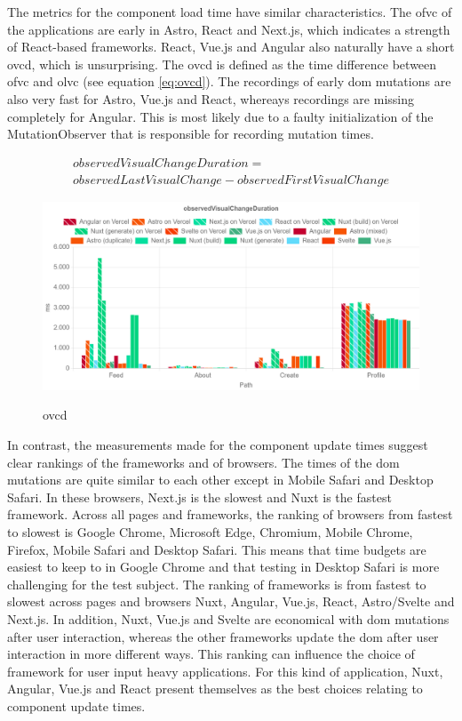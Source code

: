 \documentclass[a4paper, 12pt]{article}
\begin{document}
The metrics for the component load time have similar characteristics.
The \acrshort{ofvc} of the applications are early in Astro, React and Next.js, which indicates a strength of React-based frameworks.
React, Vue.js and Angular also naturally have a short \acrfull{ovcd}, which is unsurprising.
The \acrshort{ovcd} is defined as the time difference between \acrshort{ofvc} and \acrshort{olvc} (see equation \ref{eq:ovcd}).
The recordings of early \acrshort{dom} mutations are also very fast for Astro, Vue.js and React, whereays recordings are missing completely for Angular.
This is most likely due to a faulty initialization of the MutationObserver that is responsible for recording mutation times.

\begin{multline}\label{eq:ovcd}
  \mathit{observedVisualChangeDuration} =\\ \mathit{observedLastVisualChange} - \mathit{observedFirstVisualChange}
\end{multline}

\begin{figure}[h]
  \centering
  \includegraphics[width=0.8\linewidth, keepaspectratio]{img/lighthouse-results/olvc-ofvc.png}
  \label{fig:LH:OVCD}
  \caption{\acrfull{ovcd}}
\end{figure}

In contrast, the measurements made for the component update times suggest clear rankings of the frameworks and of browsers.
The times of the \acrshort{dom} mutations are quite similar to each other except in Mobile Safari and Desktop Safari.
In these browsers, Next.js is the slowest and Nuxt is the fastest framework.
Across all pages and frameworks, the ranking of browsers from fastest to slowest is Google Chrome, Microsoft Edge, Chromium, Mobile Chrome, Firefox, Mobile Safari and Desktop Safari.
This means that time budgets are easiest to keep to in Google Chrome and that testing in Desktop Safari is more challenging for the test subject.
The ranking of frameworks is from fastest to slowest across pages and browsers Nuxt, Angular, Vue.js, React, Astro/Svelte and Next.js.
In addition, Nuxt, Vue.js and Svelte are economical with \acrshort{dom} mutations after user interaction, whereas the other frameworks update the \acrshort{dom} after user interaction in more different ways.
This ranking can influence the choice of framework for user input heavy applications.
For this kind of application, Nuxt, Angular, Vue.js and React present themselves as the best choices relating to component update times.
\end{document}
